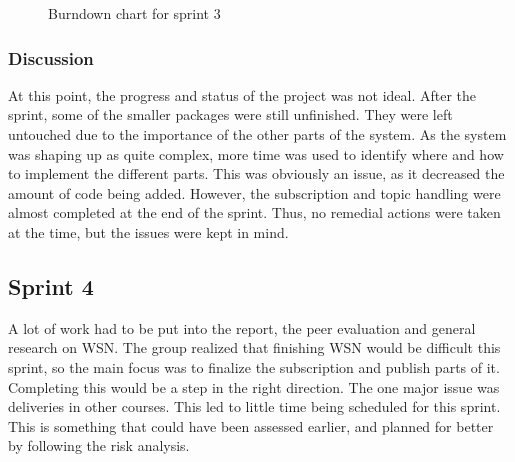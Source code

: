 \begin{center}
  \begin{figure}[ht!]
    \caption{Burndown chart for sprint 3}
    \label{fig:sprint 3, burndown}
  \end{figure}
\end{center}

\subsubsection{Discussion}
\label{subsec:project_lifecycle-development-sprint_3-discussion}

At this point, the progress and status of the project was not ideal. After the sprint, some of the smaller packages were still unfinished. They were left untouched due to the importance of the other parts of the system. As the system was shaping up as quite complex, more time was used to identify where and how to implement the different parts. This was obviously an issue, as it decreased the amount of code being added. However, the subscription and topic handling were almost completed at the end of the sprint. Thus, no remedial actions were taken at the time, but the issues were kept in mind.


\subsection{Sprint 4}
\label{subsec:project_lifecycle-development-sprint_4}

A lot of work had to be put into the report, the peer evaluation and general research on WSN. The group realized that finishing WSN would be difficult this sprint, so the main focus was to finalize the subscription and publish parts of it. Completing this would be a step in the right direction. The one major issue was deliveries in other courses. This led to little time being scheduled for this sprint. This is something that could have been assessed earlier, and planned for better by following the risk analysis.

